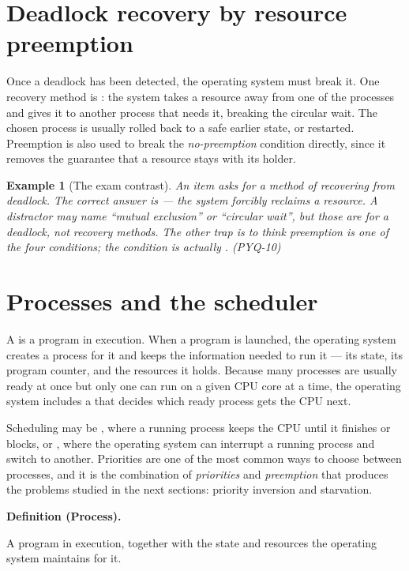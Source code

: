 \documentclass[11pt]{article}
\newtheorem{example}{Example}[section]
\newenvironment{definitionbox}[1]{%
  \par\noindent\textbf{Definition (#1).}\ \itshape
}{\par\vspace{0.3em}}
\begin{document}
\section{Deadlock recovery by resource preemption}
Once a deadlock has been detected, the operating system must break it. One
recovery method is : the system takes a resource away
from one of the processes and gives it to another process that needs it,
breaking the circular wait. The chosen process is usually rolled back to a
safe earlier state, or restarted. Preemption is also used to break the
\emph{no-preemption} condition directly, since it removes the guarantee that a
resource stays with its holder.

\begin{example}[The exam contrast]
An item asks for a method of \emph{recovering} from deadlock. The correct
answer is  --- the system forcibly reclaims a
resource. A distractor may name ``mutual exclusion'' or ``circular wait'',
but those are  for a deadlock, not recovery
methods. The other trap is to think preemption is one of the four conditions;
the condition is actually . (PYQ-10)
\end{example}

\section{Processes and the scheduler}
A  is a program in execution. When a program is launched, the
operating system creates a process for it and keeps the information needed to
run it --- its state, its program counter, and the resources it holds. Because
many processes are usually ready at once but only one can run on a given CPU
core at a time, the operating system includes a  that decides
which ready process gets the CPU next.

Scheduling may be , where a running process keeps the CPU
until it finishes or blocks, or , where the operating system
can interrupt a running process and switch to another. Priorities are one of
the most common ways to choose between processes, and it is the combination of
\emph{priorities} and \emph{preemption} that produces the problems studied in
the next sections: priority inversion and starvation.

\begin{definitionbox}{Process}
A program in execution, together with the state and resources the operating
system maintains for it.
\end{definitionbox}
\end{document}
